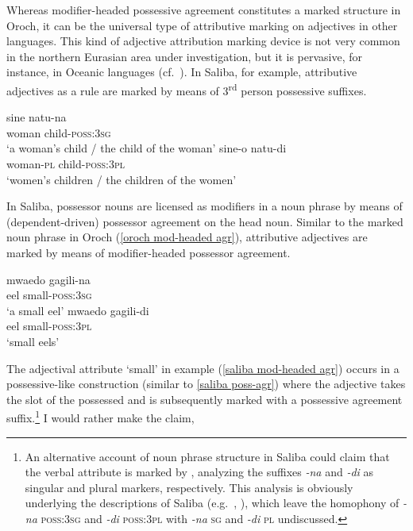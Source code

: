 Whereas modifier\hyp{}headed possessive agreement constitutes a marked structure in Oroch, it can be the universal type of attributive marking on adjectives in other languages. This kind of adjective attribution marking device is not very common in the northern Eurasian area under investigation, but it is pervasive, for instance, in Oceanic languages (cf.~\citealt{ross1998}). In Saliba, for example, attributive adjectives as a rule are marked by means of 3\textsuperscript{rd} person possessive suffixes.
\begin{exe}
\ex
{} \label{saliba poss-agr}
\begin{xlist}
\ex
\gll 	sine natu-na\\
 	woman child-\textsc{poss:3sg}\\
\glt ‘a woman's child / the child of the woman’
\ex
\gll 	sine-o natu-di\\
	woman-\textsc{pl} child-\textsc{poss:3pl}\\
\glt	‘women's children / the children of the women’%
\end{xlist}
\end{exe}
In Saliba, possessor nouns are licensed as modifiers in a noun phrase by means of (dependent\hyp{}driven) possessor agreement on the head noun. Similar to the marked noun phrase in Oroch (\ref{oroch mod-headed agr}), attributive adjectives are marked by means of modifier\hyp{}headed possessor agreement.
\begin{exe}
\ex
{} \label{saliba mod-headed agr}
\begin{xlist}
\ex
\gll 	mwaedo gagili-na\\
 eel small-\textsc{poss:3sg}\\
\glt ‘a small eel’
\ex
\gll 	mwaedo gagili-di\\
	eel small-\textsc{poss:3pl}\\
\glt ‘small eels’
\end{xlist}
\end{exe}
The adjectival attribute ‘small’ in example (\ref{saliba mod-headed agr}) occurs in a possessive-like construction (similar to \ref{saliba poss-agr}) where the adjective takes the slot of the possessed and is subsequently marked with a possessive agreement suffix.\footnote{An alternative account of noun phrase structure in Saliba could claim that the verbal attribute is marked by , analyzing the suffixes \textit{-na} and \textit{-di} as singular and plural markers, respectively. This analysis is obviously underlying the descriptions of Saliba (e.g.~\citealt{mosel1994}, \citealt{margetts1999}), which leave the homophony of \textit{-na} \textsc{poss:3sg} and \textit{-di} \textsc{poss:3pl} with \textit{-na} \textsc{sg} and \textit{-di} \textsc{pl} undiscussed.}  I would rather make the claim, %
